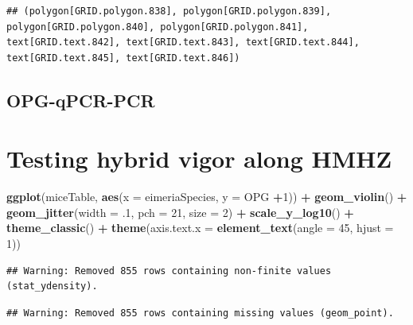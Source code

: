 \documentclass[]{article}
\newenvironment{Shaded}{\begin{snugshade}}{\end{snugshade}}
\newcommand{\KeywordTok}[1]{\textcolor[rgb]{0.13,0.29,0.53}{\textbf{#1}}}
\newcommand{\DataTypeTok}[1]{\textcolor[rgb]{0.13,0.29,0.53}{#1}}
\newcommand{\DecValTok}[1]{\textcolor[rgb]{0.00,0.00,0.81}{#1}}
\newcommand{\StringTok}[1]{\textcolor[rgb]{0.31,0.60,0.02}{#1}}
\newcommand{\OperatorTok}[1]{\textcolor[rgb]{0.81,0.36,0.00}{\textbf{#1}}}
\newcommand{\NormalTok}[1]{#1}
\begin{document}
\begin{verbatim}
## (polygon[GRID.polygon.838], polygon[GRID.polygon.839], polygon[GRID.polygon.840], polygon[GRID.polygon.841], text[GRID.text.842], text[GRID.text.843], text[GRID.text.844], text[GRID.text.845], text[GRID.text.846])
\end{verbatim}

\subsection{OPG-qPCR-PCR}\label{opg-qpcr-pcr}

\section{Testing hybrid vigor along
HMHZ}\label{testing-hybrid-vigor-along-hmhz}

\begin{Shaded}
\begin{Highlighting}[]
\KeywordTok{ggplot}\NormalTok{(miceTable, }\KeywordTok{aes}\NormalTok{(}\DataTypeTok{x =}\NormalTok{ eimeriaSpecies, }\DataTypeTok{y =}\NormalTok{ OPG }\OperatorTok{+}\DecValTok{1}\NormalTok{)) }\OperatorTok{+}
\StringTok{  }\KeywordTok{geom_violin}\NormalTok{() }\OperatorTok{+}
\StringTok{  }\KeywordTok{geom_jitter}\NormalTok{(}\DataTypeTok{width =}\NormalTok{ .}\DecValTok{1}\NormalTok{, }\DataTypeTok{pch =} \DecValTok{21}\NormalTok{, }\DataTypeTok{size =} \DecValTok{2}\NormalTok{) }\OperatorTok{+}
\StringTok{  }\KeywordTok{scale_y_log10}\NormalTok{() }\OperatorTok{+}
\StringTok{  }\KeywordTok{theme_classic}\NormalTok{() }\OperatorTok{+}
\StringTok{  }\KeywordTok{theme}\NormalTok{(}\DataTypeTok{axis.text.x =} \KeywordTok{element_text}\NormalTok{(}\DataTypeTok{angle =} \DecValTok{45}\NormalTok{, }\DataTypeTok{hjust =} \DecValTok{1}\NormalTok{)) }
\end{Highlighting}
\end{Shaded}

\begin{verbatim}
## Warning: Removed 855 rows containing non-finite values (stat_ydensity).
\end{verbatim}

\begin{verbatim}
## Warning: Removed 855 rows containing missing values (geom_point).
\end{verbatim}
\end{document}
